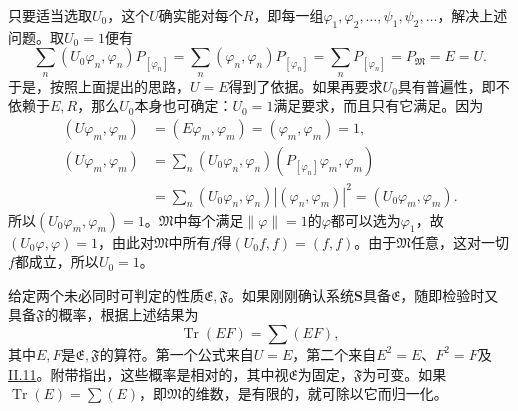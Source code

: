 \documentclass[fontsize=13pt,twoside,openany,headings=normal,parskip=false,bookmarkpackage=false,DIV=calc]{scrbook}
\begin{document}
只要适当选取$U_0$，这个$U$确实能对每个$R$，即每一组$\varphi_1,\allowbreak \varphi_2,\allowbreak \ldots,\allowbreak \psi_1,\allowbreak \psi_2,\allowbreak \ldots$，解决上述问题。取$U_0=1$便有
\[
\sum_n(U_0\varphi_n,\varphi_n)P_{[\varphi_n]}
=\sum_n(\varphi_n,\varphi_n)P_{[\varphi_n]}
=\sum_nP_{[\varphi_n]}=P_{\mathfrak M}=E=U.
\]
于是，按照上面提出的思路，$U=E$得到了依据。如果再要求$U_0$具有普遍性，即不依赖于$E,\allowbreak R$，那么$U_0$本身也可确定：$U_0=1$满足要求，而且只有它满足。因为
\begin{align*}
(U\varphi_m,\varphi_m)&=(E\varphi_m,\varphi_m)=(\varphi_m,\varphi_m)=1,\\
(U\varphi_m,\varphi_m)&=\sum_n(U_0\varphi_n,\varphi_n)(P_{[\varphi_n]}\varphi_m,\varphi_m)\\
&=\sum_n(U_0\varphi_n,\varphi_n)|(\varphi_n,\varphi_m)|^2
=(U_0\varphi_m,\varphi_m).
\end{align*}
所以$(U_0\varphi_m,\allowbreak \varphi_m)=1$。$\mathfrak M$中每个满足$\|\varphi\|=1$的$\varphi$都可以选为$\varphi_1$，故$(U_0\varphi,\allowbreak \varphi)=1$，由此对$\mathfrak M$中所有$f$得$(U_0f,\allowbreak f)=(f,\allowbreak f)$。由于$\mathfrak M$任意，这对一切$f$都成立，所以$U_0=1$。

给定两个未必同时可判定的性质$\mathfrak E,\allowbreak \mathfrak F$。如果刚刚确认系统$\boldsymbol{S}$具备$\mathfrak E$，随即检验时又具备$\mathfrak F$的概率，根据上述结果为
\[
\operatorname{Tr}(EF)=\sum(EF),
\]
其中$E,\allowbreak F$是$\mathfrak E,\allowbreak \mathfrak F$的算符。第一个公式来自$U=E$，第二个来自$E^2=E$、$F^2=F$及 \hyperref[sec:II.11]{II.11}。附带指出，这些概率\hypertarget{origpage-183}{}\label{origpage-183}是相对的，其中视$\mathfrak E$为固定，$\mathfrak F$为可变。如果$\operatorname{Tr}(E)=\sum(E)$，即$\mathfrak M$的维数，是有限的，就可除以它而归一化。
\end{document}
